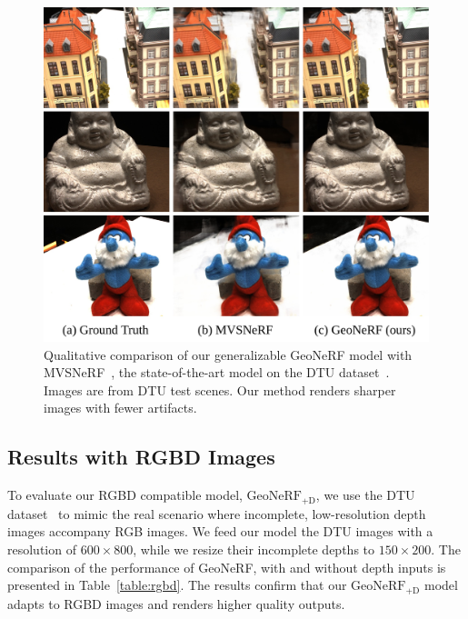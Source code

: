\FloatBarrier

\begin{figure}[!t]
    \begin{center}
        \includegraphics[width=0.9\linewidth]{images/chapter3/figures/Fig3.jpg}
    \end{center}
   \caption{Qualitative comparison of our generalizable GeoNeRF model with MVSNeRF~\cite{chen2021mvsnerf}, the state-of-the-art model on the DTU dataset~\cite{jensen2014large}. Images are from DTU test scenes. Our method renders sharper images with fewer artifacts.}
    \label{fig:c3_qualitative_dtu}
\end{figure}

\subsection{Results with RGBD Images} \label{sec:c3_rgbd}
To evaluate our RGBD compatible model, $\text{GeoNeRF}_{\text{+D}}$, we use the DTU dataset~\cite{jensen2014large} to mimic the real scenario where incomplete, low-resolution depth images accompany RGB images. We feed our model the DTU images with a resolution of $600 \times 800$, while we resize their incomplete depths to $150 \times 200$. The comparison of the performance of GeoNeRF, with and without depth inputs is presented in Table~\ref{table:rgbd}. The results confirm that our $\text{GeoNeRF}_{\text{+D}}$ model adapts to RGBD images and renders higher quality outputs.

